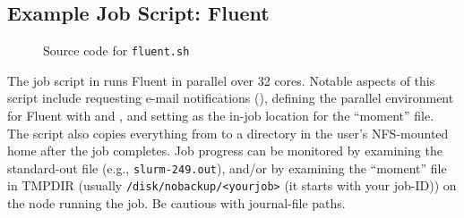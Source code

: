 %
\subsection{Example Job Script: Fluent}
\label{sect:example-fluent}

\begin{figure}[htpb]
  
  \caption{Source code for \texttt{fluent.sh}}
  \label{fig:fluent.sh}
\end{figure}

The job script in  runs Fluent in parallel over 32 cores.
Notable aspects of this script include requesting e-mail notifications (),
defining the parallel environment for Fluent with  and ,
and setting  as the in-job location for the ``moment''  file.
The script also copies everything from  to a directory in the user's NFS-mounted home after the job completes.
Job progress can be monitored by examining the standard-out file (e.g.,
\texttt{slurm-249.out}), and/or by examining the ``moment'' file in TMPDIR (usually
\texttt{/disk/nobackup/<yourjob>} (it starts with your job-ID)) on the node running
the job. Be cautious with journal-file paths.